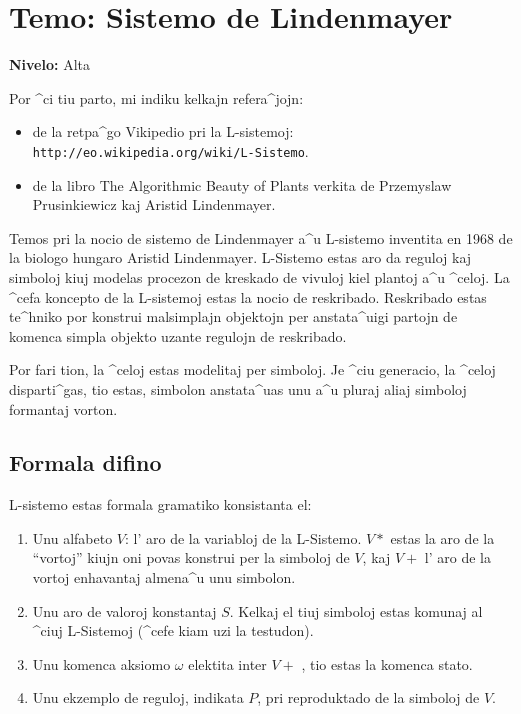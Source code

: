 \chapter{Temo: Sistemo de Lindenmayer}

{ }\hfill\textbf{Nivelo:} Alta

Por ^ci tiu parto, mi indiku kelkajn refera^jojn:
\begin{itemize}
 \item de la retpa^go Vikipedio pri la L-sistemoj: \texttt{http://eo.wikipedia.org/wiki/L-Sistemo}.
 \item de la libro \og The Algorithmic Beauty of Plants\fg{} verkita
   de Przemyslaw Prusinkiewicz kaj Aristid Lindenmayer.
\end{itemize}

\vspace*{0.5cm} 

Temos pri la nocio de sistemo de Lindenmayer a^u L-sistemo inventita
en 1968 de la biologo hungaro Aristid Lindenmayer.  L-Sistemo estas
aro da reguloj kaj simboloj kiuj modelas procezon de kreskado de
vivuloj kiel plantoj a^u ^celoj.  La ^cefa koncepto de la L-sistemoj
estas la nocio de reskribado.  Reskribado estas te^hniko por konstrui
malsimplajn objektojn per anstata^uigi partojn de komenca simpla
objekto uzante regulojn de reskribado.

Por fari tion, la ^celoj estas modelitaj per simboloj.  Je ^ciu
generacio, la ^celoj disparti^gas, tio estas, simbolon anstata^uas unu
a^u pluraj aliaj simboloj formantaj vorton.

\section{Formala difino}

L-sistemo estas formala gramatiko konsistanta el:
\begin{enumerate}
\item Unu alfabeto $V$: l' aro de la variabloj de la L-Sistemo. $V *$
  estas la aro de la ``vortoj'' kiujn oni povas konstrui per la simboloj
  de $V$, kaj $V +$ l' aro de la vortoj enhavantaj almena^u unu simbolon.
\item Unu aro de valoroj konstantaj $S$.  Kelkaj el tiuj simboloj
  estas komunaj al ^ciuj L-Sistemoj (^cefe kiam uzi la testudon).
\item Unu komenca aksiomo $\omega$ elektita inter $V +$ , tio estas la
  komenca stato.
\item Unu ekzemplo de reguloj, indikata $P$, pri reproduktado de la
  simboloj de $V$.
\end{enumerate}

